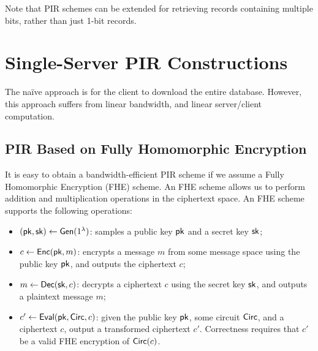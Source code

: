 Note that PIR schemes can be extended 
for retrieving records containing multiple bits, rather than
just 1-bit records. 

\section{Single-Server PIR Constructions}

The na\"ive approach is for 
the client to download the entire database. 
However, this approach suffers from linear bandwidth,
and linear server/client computation. 

\subsection{PIR Based on Fully Homomorphic Encryption}
It is easy to obtain a bandwidth-efficient
PIR scheme if we assume a Fully Homomorphic Encryption (FHE)
scheme. 
An FHE scheme allows us to perform addition and multiplication operations 
in the ciphertext space. 
An FHE scheme supports
the following operations: %
\begin{itemize}
\item 
$({\sf pk}, {\sf sk}) \leftarrow {\sf Gen}(1^\lambda)$: samples
 a public key ${\sf pk}$ and a secret key ${\sf sk}$; 
\item 
$c \leftarrow {\sf Enc}({\sf pk}, m)$: encrypts a message $m$
from some message space using the public 
key ${\sf pk}$, and outputs the ciphertext $c$;
\item  
$m \leftarrow {\sf Dec}({\sf sk}, c)$: %
decrypts a ciphertext $c$ using the secret key ${\sf sk}$,
and outputs a plaintext message $m$;
\item  
$c' \leftarrow {\sf Eval}({\sf pk}, {\sf Circ}, c)$:
given 
the public key ${\sf pk}$, some circuit ${\sf Circ}$, and
a ciphertext $c$, output a transformed ciphertext $c'$.
Correctness requires that 
$c'$ be a valid FHE encryption of 
${\sf Circ}(c)$.
\end{itemize}

